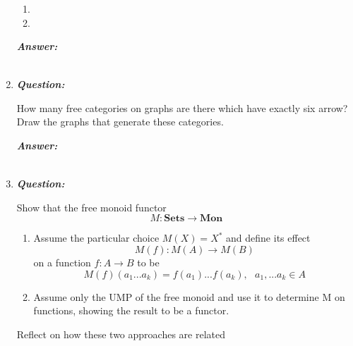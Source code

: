 \documentclass{article}
\begin{document}
\begin{enumerate}
\begin{enumerate}
		      \item {}

		      \item {}
	      \end{enumerate}

	      \textbf{\textit{Answer:}}

	      \begin{align*}
	      \end{align*}

	\item
	      \textbf{\textit{Question:}}

	      How many free categories on graphs are there which have exactly six arrow? Draw the graphs that generate these categories.

	      \textbf{\textit{Answer:}}

	      \begin{align*}
	      \end{align*}



	\item
	      \textbf{\textit{Question:}}

	      Show that the free monoid functor
	      \[
		      M : \textbf{Sets} \rightarrow \textbf{Mon}
	      \]
	      \begin{enumerate}
		      \item Assume the particular choice $ M(X) = X^*   $ and define its effect
		            \[
			            M(f) : M(A) \rightarrow M(B)
		            \]
		            on a function $ f : A \rightarrow B$ to be
		            \[
			            M(f)(a_1...a_k) = f(a_1) ... f(a_k), \ \ \ a_1,...a_k \in A
		            \]
		      \item Assume only the UMP of the free monoid and use it to determine M on functions, showing the result to be a functor.

	      \end{enumerate}
	      Reflect on how these two approaches are related



\end{enumerate}
\end{document}
